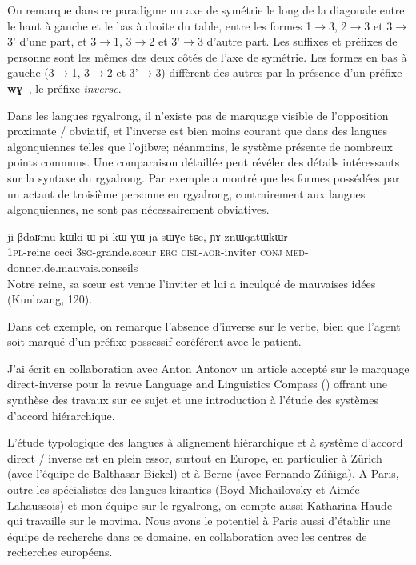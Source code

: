 \documentclass[oldfontcommands,oneside,a4paper,11pt]{memoir}
\newcommand{\ipa}[1]{{\phon\textbf{#1}}}
\newcommand{\aor}{\textsc{aor}}
\newcommand{\cisl}{\textsc{cisl}}
\newcommand{\conj}{\textsc{conj}}
\newcommand{\erg}{\textsc{erg}}
\newcommand{\med}{\textsc{med}}
\newcommand{\pl}{\textsc{pl}}
\newcommand{\sg}{\textsc{sg}}
\begin{document}
On remarque dans ce paradigme un axe de symétrie le long de la diagonale entre le haut à gauche et le bas à droite du table, entre les formes 1$\rightarrow$3, 2$\rightarrow$3 et 3$\rightarrow$3' d'une part, et 3$\rightarrow$1, 3$\rightarrow$2 et 3'$\rightarrow$3 d'autre part. 
Les suffixes et préfixes de personne sont les mêmes des deux côtés de l'axe de symétrie. Les formes en bas à gauche (3$\rightarrow$1, 3$\rightarrow$2 et 3'$\rightarrow$3) diffèrent des autres par la présence d'un préfixe \ipa{wɣ--}, le préfixe \textit{inverse}. 

Dans les langues rgyalrong, il n'existe pas de marquage visible de l'opposition proximate / obviatif, et l'inverse est bien moins courant que dans des langues algonquiennes telles que l'ojibwe; néanmoins, le système présente de nombreux points communs. Une comparaison détaillée peut révéler des détails intéressants sur la syntaxe du rgyalrong. Par exemple \citet{jacques10inverse} a montré que les formes possédées par un actant de troisième personne en rgyalrong, contrairement aux langues algonquiennes, ne sont pas nécessairement obviatives.
\begin{exe} 
 \ex 
\gll ji-βdaʁmu	kɯki	ɯ-pi	kɯ	ɣɯ-ja-sɯɣe	tɕe,	ɲɤ-znɯqatɯkɯr \\
	1\pl{}-reine ceci 3\sg{}-grande.sœur \erg{} \cisl{}-\aor{}-inviter \conj{} \med{}-donner.de.mauvais.conseils \\
	\glt Notre reine, sa sœur est venue l'inviter et lui a inculqué de mauvaises idées (Kunbzang, 120).
\end{exe}
Dans cet exemple, on remarque l'absence d'inverse sur le verbe, bien que l'agent soit marqué d'un préfixe possessif coréférent avec le patient. 

J'ai écrit en collaboration avec Anton Antonov un article accepté sur le marquage direct-inverse pour la revue Language and Linguistics Compass (\citealt{jacques14inverse}) offrant une synthèse des travaux sur ce sujet et une introduction à l'étude des systèmes d'accord hiérarchique.

L'étude typologique des langues à alignement hiérarchique et à système d'accord direct / inverse est en plein essor, surtout en Europe, en particulier à Zürich (avec l'équipe de Balthasar Bickel) et à Berne (avec Fernando Zúñiga). A Paris, outre les spécialistes des langues kiranties (Boyd Michailovsky et Aimée Lahaussois) et mon équipe sur le rgyalrong, on compte aussi Katharina Haude qui travaille sur le movima. Nous avons le potentiel à Paris aussi d'établir une équipe de recherche dans ce domaine, en collaboration avec les centres de recherches   européens.
\end{document}
